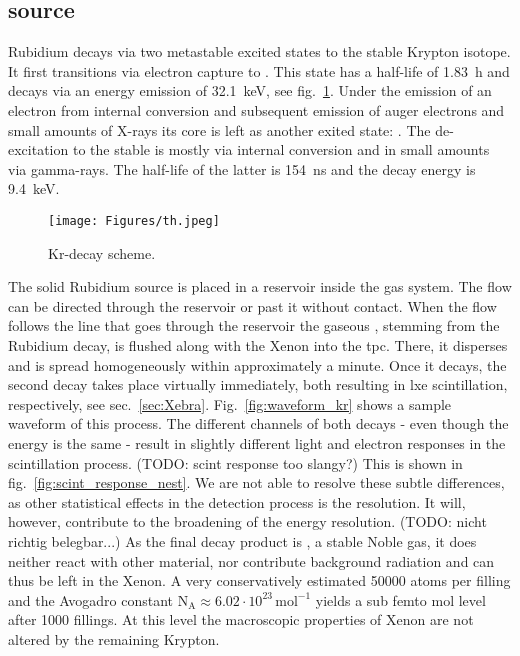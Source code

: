 
\FloatBarrier
\subsection{source}
\label{ssec:source}
\FloatBarrier


Rubidium  decays via two metastable excited states to the stable  Krypton isotope.
It first transitions via electron capture to .
This state has a half-life of \SI{1.83}{\hour} and decays via an energy emission of \SI{32.1}{\kilo\electronvolt}, see fig.~\ref{fig:scheme_kr}.
Under the emission of an electron from internal conversion and subsequent emission of auger electrons and small amounts of X-rays its core is left as another exited state: .
The de-excitation to the stable  is mostly via internal conversion and in small amounts via gamma-rays.
The half-life of the latter is \SI{154}{\nano\s} and the decay energy is \SI{9.4}{\kilo\electronvolt}.


\begin{figure}
    \centering
    \texttt{[image: Figures/th.jpeg]}  %
    \caption[Decay Scheme Krypton]{Kr-decay scheme\cite{kr_scheme}.}
    \label{fig:scheme_kr}
\end{figure}

The solid Rubidium source is placed in a reservoir inside the gas system.
The flow can be directed through the reservoir or past it without contact.
When the flow follows the line that goes through the reservoir the gaseous , stemming from the Rubidium decay, is flushed along with the Xenon into the \gls{tpc}.
There, it disperses and is spread homogeneously within approximately a minute.
Once it decays, the second decay takes place virtually immediately, both resulting in \gls{lxe} scintillation, respectively, see sec.~\ref{sec:Xebra}.
Fig.~\ref{fig:waveform_kr} shows a sample waveform of this process.
The different channels of both decays - even though the energy is the same - result in slightly different light and electron responses in the scintillation process. (TODO: scint response too slangy?)
This is shown in fig.~\ref{fig:scint_response_nest}.
We are not able to resolve these subtle differences, as other statistical effects in the detection process is the resolution.
It will, however, contribute to the broadening of the energy resolution. (TODO: nicht richtig belegbar...)
As the final decay product is , a stable Noble gas, it does neither react with other material, nor contribute background radiation and can thus be left in the Xenon.
A very conservatively estimated \SI{50000}{} atoms per filling and the Avogadro constant $ \mathrm{N}_\mathrm{A} \approx 6.02\cdot10^{23}\,\mathrm{mol}^{-1} $ yields a sub femto mol level after 1000 fillings.
At this level the macroscopic properties of Xenon are not altered by the remaining Krypton.


